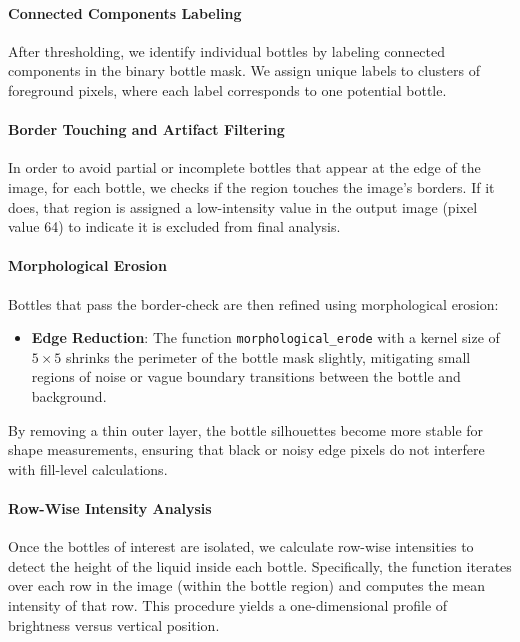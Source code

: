 \documentclass[a4paper,12pt]{article}
\begin{document}
\paragraph{Connected Components Labeling}

After thresholding, we identify individual bottles by labeling connected components in the binary bottle mask. We assign unique labels to clusters of foreground pixels, where each label corresponds to one potential bottle.

\paragraph{Border Touching and Artifact Filtering}

In order to avoid partial or incomplete bottles that appear at the edge of the image, for each bottle, we checks if the region touches the image's borders. If it does, that region is assigned a low-intensity value in the output image (pixel value 64) to indicate it is excluded from final analysis.

\paragraph{Morphological Erosion}

Bottles that pass the border-check are then refined using morphological erosion:
\begin{itemize}
    \item \textbf{Edge Reduction}: The function \texttt{morphological\_erode} with a kernel size of \(5 \times 5\) shrinks the perimeter of the bottle mask slightly, mitigating small regions of noise or vague boundary transitions between the bottle and background.
\end{itemize}
By removing a thin outer layer, the bottle silhouettes become more stable for shape measurements, ensuring that black or noisy edge pixels do not interfere with fill-level calculations.

\paragraph{Row-Wise Intensity Analysis}

Once the bottles of interest are isolated, we calculate row-wise intensities to detect the height of the liquid inside each bottle. Specifically, the function iterates over each row in the image (within the bottle region) and computes the mean intensity of that row. This procedure yields a one-dimensional profile of brightness versus vertical position.
\end{document}
